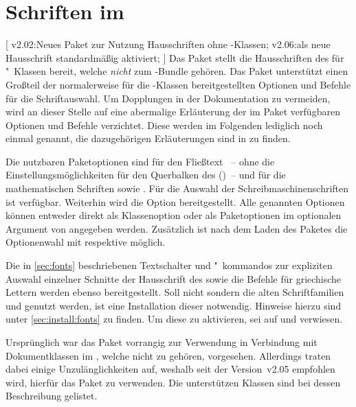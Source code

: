 \section[%
  Das Paket \Package{tudscrfonts} -- Schriften im \CD%
]{%
  Schriften im \CD%
}
%
\begin{DeclareEntity}{}[%
  v2.02:Neues Paket zur Nutzung Hausschriften ohne \TUDScript-Klassen;%
  v2.06:\OpenSans als neue Hausschrift standardmäßig aktiviert;%
]
%
Das Paket  stellt die Hausschriften des \TUDCDs für 
"~Klassen bereit, welche \emph{nicht} zum \TUDScript-Bundle 
gehören. Das Paket unterstützt einen Großteil der normalerweise für die 
\TUDScript-Klassen bereitgestellten Optionen und Befehle für die 
Schriftauswahl. Um Dopplungen in der Dokumentation zu vermeiden, wird an dieser 
Stelle auf eine abermalige Erläuterung der im Paket  
verfügbaren Optionen und Befehle verzichtet. Diese werden im Folgenden 
lediglich noch einmal genannt, die dazugehörigen Erläuterungen sind in 
 zu finden.

Die nutzbaren Paketoptionen sind für den Fließtext ~-- ohne die 
Einstellungsmöglichkeiten für den Querbalken des \CDs ()~-- und 
für die mathematischen Schriften  sowie . 
Für die Auswahl der Schreibmaschinenschriften ist  verfügbar. 
Weiterhin wird die Option  bereitgestellt. Alle genannten 
Optionen können entweder direkt als Klassenoption oder als Paketoptionen im 
optionalen Argument von 
 angegeben 
werden. Zusätzlich ist nach dem Laden des Paketes die Optionenwahl mit 
 respektive  möglich.

Die in \autoref{sec:fonts} beschriebenen Textschalter und "~kommandos zur 
expliziten Auswahl einzelner Schnitte der Hausschrift des \CDs sowie die 
Befehle für griechische Lettern werden ebenso bereitgestellt.
%
Soll nicht \OpenSans sondern die alten Schriftfamilien \Univers und \DIN 
genutzt werden, ist eine Installation dieser notwendig. Hinweise hierzu sind 
unter \autoref{sec:install:fonts} zu finden. Um diese zu aktivieren, sei auf 
 und  verwiesen.

%
Ursprünglich war das Paket  vorrangig zur Verwendung in 
Verbindung mit Dokumentklassen im \TUDCD, welche nicht zu \TUDScript gehören, 
vorgesehen. Allerdings traten dabei einige Unzulänglichkeiten auf, weshalb seit 
der Version~v2.05 empfohlen wird, hierfür das Paket  
zu verwenden. Die unterstützen Klassen sind bei dessen Beschreibung gelistet. 
\end{DeclareEntity}




